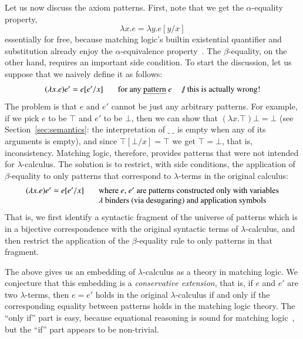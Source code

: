 \documentclass[UTF8,11pt]{article}
\theoremstyle{plain}
\theoremstyle{definition}
\theoremstyle{remark}
\newcommand{\doubleslash}{/\!/{ }}
\begin{document}
Let us now discuss the axiom patterns.
First, note that we get the $\alpha$-equality property,
$$
\lambda x . e = \lambda y . e[y/x]
$$
essentially for free, because matching logic's builtin existential quantifier
and substitution already enjoy the $\alpha$-equivalence
property~\cite{rosu-2017-lmcs}.
The $\beta$-equality, on the other hand, requires an important side condition.
To start the discussion, let us suppose that we naively define it as follows:
$$
\begin{array}{r@{\hspace*{4ex}}l}
(\lambda x . e)e' = e[e'/x]
&
\textrm{for any \emph{pattern} $e$ \ \ \ \ \doubleslash this is actually wrong!}
\end{array}
$$
The problem is that $e$ and $e'$ cannot be just any arbitrary patterns.
For example, if we pick $e$ to be $\top$ and $e'$ to be $\bot$, then
we can show that $(\lambda x . \top)\bot = \bot$
(see Section~\ref{sec:semantics}: the interpretation of $\_\,\_$ is empty
when any of its arguments is empty), and since $\top[\bot/x] = \top$ we
get $\top = \bot$, that is, inconsistency.
Matching logic, therefore, provides patterns that were not intended for
$\lambda$-calculus.
The solution is to restrict, with side conditions, the application of
$\beta$-equality to only patterns that correspond to $\lambda$-terms
in the original calculus:
$$
\begin{array}{r@{\hspace*{4ex}}l}
(\lambda x . e)e' = e[e'/x]
& \textrm{where $e$, $e'$ are patterns constructed only with variables}
\\
& \textrm{$\lambda$ binders (via desugaring) and application symbols}
\end{array}
$$
That is, we first identify a syntactic fragment of the universe of
patterns which is in a bijective correspondence with the original
syntactic terms of $\lambda$-calculus, and then restrict the
application of the $\beta$-equality rule to only patterns in that
fragment.

The above gives us an embedding of $\lambda$-calculus as a theory
in matching logic.
We conjecture that this embedding is a \emph{conservative extension},
that is, if $e$ and $e'$ are two $\lambda$-terms, then $e=e'$ holds
in the original $\lambda$-calculus if and only if the corresponding
equality between patterns holds in the matching logic theory.
The ``only if'' part is easy, because equational reasoning is sound
for matching logic~\cite{rosu-2017-lmcs}, but the ``if'' part appears
to be non-trivial.
\end{document}
